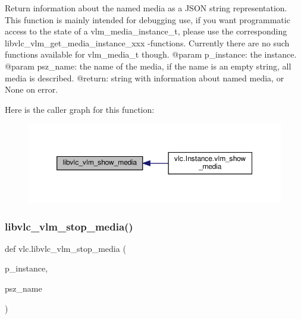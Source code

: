 \begin{DoxyVerb}Return information about the named media as a JSON
string representation.
This function is mainly intended for debugging use,
if you want programmatic access to the state of
a vlm_media_instance_t, please use the corresponding
libvlc_vlm_get_media_instance_xxx -functions.
Currently there are no such functions available for
vlm_media_t though.
@param p_instance: the instance.
@param psz_name: the name of the media, if the name is an empty string, all media is described.
@return: string with information about named media, or None on error.
\end{DoxyVerb}
 Here is the caller graph for this function\+:
\nopagebreak
\begin{figure}[H]
\begin{center}
\leavevmode
\includegraphics[width=350pt]{namespacevlc_a23b89ca7dee175880ded4a71f076bc8a_icgraph}
\end{center}
\end{figure}
\mbox{\label{namespacevlc_a9ad79a1cc59f030bc4dbbfaa8ca7924e}} 
\subsubsection{\texorpdfstring{libvlc\+\_\+vlm\+\_\+stop\+\_\+media()}{libvlc\_vlm\_stop\_media()}}
{\footnotesize\ttfamily def vlc.\+libvlc\+\_\+vlm\+\_\+stop\+\_\+media (\begin{DoxyParamCaption}\item[{}]{p\+\_\+instance,  }\item[{}]{psz\+\_\+name }\end{DoxyParamCaption})}


